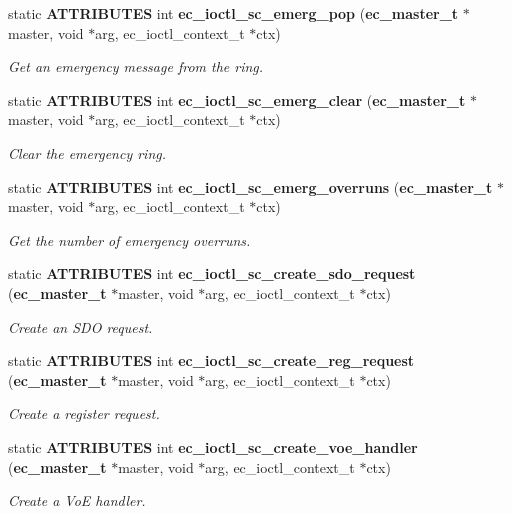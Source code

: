 \begin{DoxyCompactItemize}
static {\bf \-A\-T\-T\-R\-I\-B\-U\-T\-E\-S} int {\bf ec\-\_\-ioctl\-\_\-sc\-\_\-emerg\-\_\-pop} ({\bf ec\-\_\-master\-\_\-t} $\ast$master, void $\ast$arg, ec\-\_\-ioctl\-\_\-context\-\_\-t $\ast$ctx)
\begin{DoxyCompactList}\small\item\em \-Get an emergency message from the ring. \end{DoxyCompactList}\item 
static {\bf \-A\-T\-T\-R\-I\-B\-U\-T\-E\-S} int {\bf ec\-\_\-ioctl\-\_\-sc\-\_\-emerg\-\_\-clear} ({\bf ec\-\_\-master\-\_\-t} $\ast$master, void $\ast$arg, ec\-\_\-ioctl\-\_\-context\-\_\-t $\ast$ctx)
\begin{DoxyCompactList}\small\item\em \-Clear the emergency ring. \end{DoxyCompactList}\item 
static {\bf \-A\-T\-T\-R\-I\-B\-U\-T\-E\-S} int {\bf ec\-\_\-ioctl\-\_\-sc\-\_\-emerg\-\_\-overruns} ({\bf ec\-\_\-master\-\_\-t} $\ast$master, void $\ast$arg, ec\-\_\-ioctl\-\_\-context\-\_\-t $\ast$ctx)
\begin{DoxyCompactList}\small\item\em \-Get the number of emergency overruns. \end{DoxyCompactList}\item 
static {\bf \-A\-T\-T\-R\-I\-B\-U\-T\-E\-S} int {\bf ec\-\_\-ioctl\-\_\-sc\-\_\-create\-\_\-sdo\-\_\-request} ({\bf ec\-\_\-master\-\_\-t} $\ast$master, void $\ast$arg, ec\-\_\-ioctl\-\_\-context\-\_\-t $\ast$ctx)
\begin{DoxyCompactList}\small\item\em \-Create an \-S\-D\-O request. \end{DoxyCompactList}\item 
static {\bf \-A\-T\-T\-R\-I\-B\-U\-T\-E\-S} int {\bf ec\-\_\-ioctl\-\_\-sc\-\_\-create\-\_\-reg\-\_\-request} ({\bf ec\-\_\-master\-\_\-t} $\ast$master, void $\ast$arg, ec\-\_\-ioctl\-\_\-context\-\_\-t $\ast$ctx)
\begin{DoxyCompactList}\small\item\em \-Create a register request. \end{DoxyCompactList}\item 
static {\bf \-A\-T\-T\-R\-I\-B\-U\-T\-E\-S} int {\bf ec\-\_\-ioctl\-\_\-sc\-\_\-create\-\_\-voe\-\_\-handler} ({\bf ec\-\_\-master\-\_\-t} $\ast$master, void $\ast$arg, ec\-\_\-ioctl\-\_\-context\-\_\-t $\ast$ctx)
\begin{DoxyCompactList}\small\item\em \-Create a \-Vo\-E handler. \end{DoxyCompactList}\item 

\end{DoxyCompactItemize}
